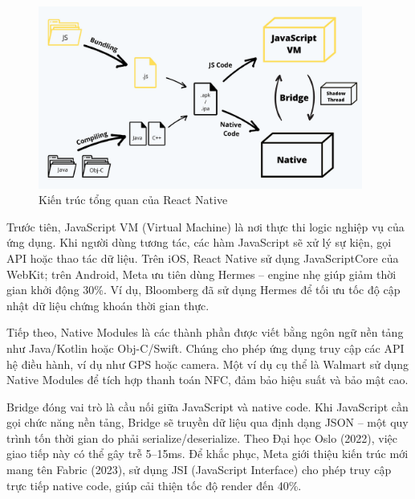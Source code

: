 \begin{figure}[H]
    \centering
    \includegraphics[width=0.95\textwidth]{images/react_native.png}
    \caption{Kiến trúc tổng quan của React Native}
\end{figure}

\begin{sloppypar}
Trước tiên, JavaScript VM (Virtual Machine) là nơi thực thi logic nghiệp vụ của ứng dụng.  
Khi người dùng tương tác, các hàm JavaScript sẽ xử lý sự kiện, gọi API hoặc thao tác dữ liệu.  
Trên iOS, React Native sử dụng JavaScriptCore của WebKit; trên Android, Meta ưu tiên dùng Hermes – engine nhẹ giúp giảm thời gian khởi động 30\%.  
Ví dụ, Bloomberg đã sử dụng Hermes để tối ưu tốc độ cập nhật dữ liệu chứng khoán thời gian thực.
\end{sloppypar}

\begin{sloppypar}
Tiếp theo, Native Modules là các thành phần được viết bằng ngôn ngữ nền tảng như Java/Kotlin hoặc Obj-C/Swift.  
Chúng cho phép ứng dụng truy cập các API hệ điều hành, ví dụ như GPS hoặc camera.  
Một ví dụ cụ thể là Walmart sử dụng Native Modules để tích hợp thanh toán NFC, đảm bảo hiệu suất và bảo mật cao.
\end{sloppypar}

\begin{sloppypar}
Bridge đóng vai trò là cầu nối giữa JavaScript và native code.  
Khi JavaScript cần gọi chức năng nền tảng, Bridge sẽ truyền dữ liệu qua định dạng JSON – một quy trình tốn thời gian do phải serialize/\-deserialize.  
Theo Đại học Oslo (2022), việc giao tiếp này có thể gây trễ 5–15ms.  
Để khắc phục, Meta giới thiệu kiến trúc mới mang tên Fabric (2023), sử dụng JSI (JavaScript\- Interface) cho phép truy cập trực tiếp native code, giúp cải thiện tốc độ render đến 40\%.
\end{sloppypar}

